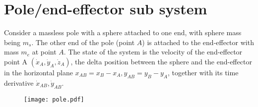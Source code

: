 \documentclass{article}
\begin{document}
\section{Pole/end-effector sub system}
Consider a massless pole with a sphere attached to one end, with sphere mass being $m_s$. The other end of the pole (point $A$) is attached to the end-effector with mass $m_e$ at point $A$. The state of the system is the velocity of the end-effector point A $(\dot{x}_A, \dot{y}_A, \dot{z}_A)$, the delta position between the sphere and the end-effector in the horizontal plane $x_{AB} = x_B - x_A, y_{AB} = y_B-y_A$, together with its time derivative $\dot{x}_{AB}, \dot{y}_{AB}$.

\begin{figure}
	\centering
	\texttt{[image: pole.pdf]}
\end{figure}
\end{document}
